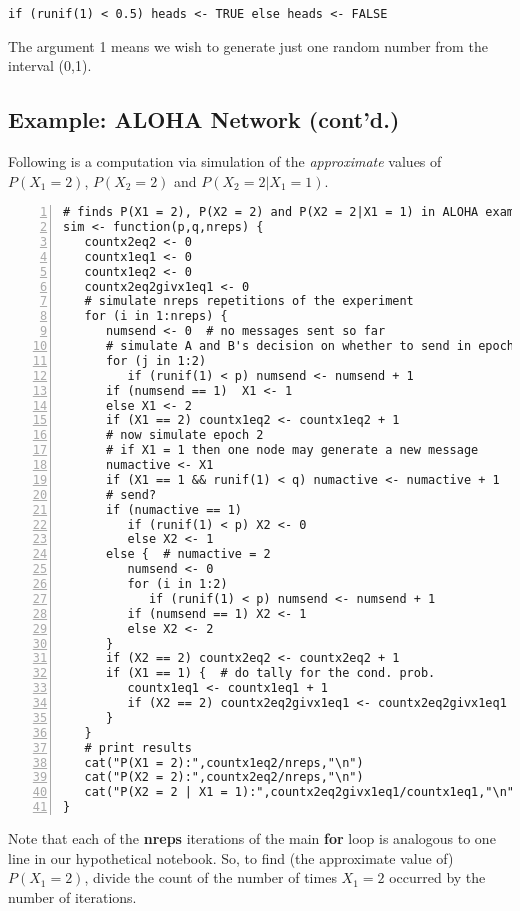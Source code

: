 \begin{Verbatim}[fontsize=\relsize{-2}]
if (runif(1) < 0.5) heads <- TRUE else heads <- FALSE
\end{Verbatim}

The argument 1 means we wish to generate just one random number from the
interval (0,1).

\subsection{Example: ALOHA Network (cont'd.)}
\label{alohasim}

Following is a computation via simulation of the {\it approximate}
values of $P(X_1 = 2)$, $P(X_2 = 2)$ and $P(X_2 = 2 | X_1 = 1)$. 


\begin{Verbatim}[fontsize=\relsize{-2},numbers=left]
# finds P(X1 = 2), P(X2 = 2) and P(X2 = 2|X1 = 1) in ALOHA example
sim <- function(p,q,nreps) {
   countx2eq2 <- 0
   countx1eq1 <- 0
   countx1eq2 <- 0
   countx2eq2givx1eq1 <- 0
   # simulate nreps repetitions of the experiment
   for (i in 1:nreps) {
      numsend <- 0  # no messages sent so far
      # simulate A and B's decision on whether to send in epoch 1
      for (j in 1:2)
         if (runif(1) < p) numsend <- numsend + 1
      if (numsend == 1)  X1 <- 1
      else X1 <- 2
      if (X1 == 2) countx1eq2 <- countx1eq2 + 1
      # now simulate epoch 2
      # if X1 = 1 then one node may generate a new message
      numactive <- X1
      if (X1 == 1 && runif(1) < q) numactive <- numactive + 1
      # send?
      if (numactive == 1) 
         if (runif(1) < p) X2 <- 0
         else X2 <- 1
      else {  # numactive = 2
         numsend <- 0
         for (i in 1:2)
            if (runif(1) < p) numsend <- numsend + 1
         if (numsend == 1) X2 <- 1
         else X2 <- 2
      }
      if (X2 == 2) countx2eq2 <- countx2eq2 + 1
      if (X1 == 1) {  # do tally for the cond. prob.
         countx1eq1 <- countx1eq1 + 1
         if (X2 == 2) countx2eq2givx1eq1 <- countx2eq2givx1eq1 + 1
      }
   }
   # print results
   cat("P(X1 = 2):",countx1eq2/nreps,"\n")
   cat("P(X2 = 2):",countx2eq2/nreps,"\n")
   cat("P(X2 = 2 | X1 = 1):",countx2eq2givx1eq1/countx1eq1,"\n")
}
\end{Verbatim}

Note that each of the {\bf nreps} iterations of the main {\bf for} loop
is analogous to one line in our hypothetical notebook.  So, to find
(the approximate value of) $P(X_1 = 2)$, divide the count of the number
of times $X_1 = 2$ occurred by the number of iterations.

